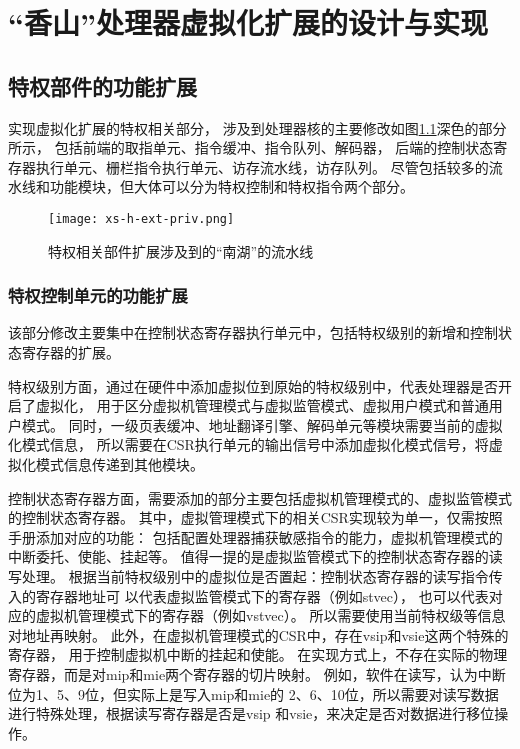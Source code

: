 \chapter{“香山”处理器虚拟化扩展的设计与实现}


\section{特权部件的功能扩展}
实现虚拟化扩展的特权相关部分，
涉及到处理器核的主要修改如图\ref{fig:xs-h-ext-priv}深色的部分所示，
包括前端的取指单元、指令缓冲、指令队列、解码器，
后端的控制状态寄存器执行单元、栅栏指令执行单元、访存流水线，访存队列。
尽管包括较多的流水线和功能模块，但大体可以分为特权控制和特权指令两个部分。

\begin{figure}[htbp]
    \centering
\texttt{[image: xs-h-ext-priv.png]}
    \caption{特权相关部件扩展涉及到的“南湖”的流水线}
    \label{fig:xs-h-ext-priv}
\end{figure}

\subsection{特权控制单元的功能扩展}
该部分修改主要集中在控制状态寄存器执行单元中，包括特权级别的新增和控制状态寄存器的扩展。

特权级别方面，通过在硬件中添加虚拟位到原始的特权级别中，代表处理器是否开启了虚拟化，
用于区分虚拟机管理模式与虚拟监管模式、虚拟用户模式和普通用户模式。
同时，一级页表缓冲、地址翻译引擎、解码单元等模块需要当前的虚拟化模式信息，
所以需要在CSR执行单元的输出信号中添加虚拟化模式信号，将虚拟化模式信息传递到其他模块。

控制状态寄存器方面，需要添加的部分主要包括虚拟机管理模式的、虚拟监管模式的控制状态寄存器。
其中，虚拟管理模式下的相关CSR实现较为单一，仅需按照手册添加对应的功能：
包括配置处理器捕获敏感指令的能力，虚拟机管理模式的中断委托、使能、挂起等。
值得一提的是虚拟监管模式下的控制状态寄存器的读写处理。
根据当前特权级别中的虚拟位是否置起：控制状态寄存器的读写指令传入的寄存器地址可
以代表虚拟监管模式下的寄存器（例如stvec），
也可以代表对应的虚拟机管理模式下的寄存器（例如vstvec）。
所以需要使用当前特权级等信息对地址再映射。
此外，在虚拟机管理模式的CSR中，存在vsip和vsie这两个特殊的寄存器，
用于控制虚拟机中断的挂起和使能。
在实现方式上，不存在实际的物理寄存器，而是对mip和mie两个寄存器的切片映射。
例如，软件在读写，认为中断位为1、5、9位，但实际上是写入mip和mie的
2、6、10位，所以需要对读写数据进行特殊处理，根据读写寄存器是否是vsip
和vsie，来决定是否对数据进行移位操作。

